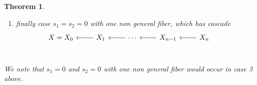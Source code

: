 \documentclass[12pt]{amsbook}
\theoremstyle{plain}
\newtheorem{thm}{Theorem}[section]
\begin{document}
\begin{thm}
\begin{enumerate}
\[\begin{tikzcd}
      &                              &                               &                                      & X_1 \arrow[ld] \arrow[lu] & X_2 \arrow[l] & X_3 \arrow[l]\\
X_b^0 & X_b^1 \arrow[l] & \cdots \arrow[l] & X_b^{b-1} \arrow[l] &                                                           &                       
\end{tikzcd}
\]
\item finally case $s_1 = s_2 =0$ with one non general fiber, which has cascade 
\[
\begin{tikzcd}
X = X_0 & X_1 \arrow[l] & \cdots \arrow[l] & X_{n-1} \arrow[l] & X_{n} \arrow[l]  &  \\
\end{tikzcd}
\]
\end{enumerate}
We note that $s_1=0$ and $s_2 = 0$ with one non general fiber would occur in case 3 above.



\end{thm}
\end{document}
